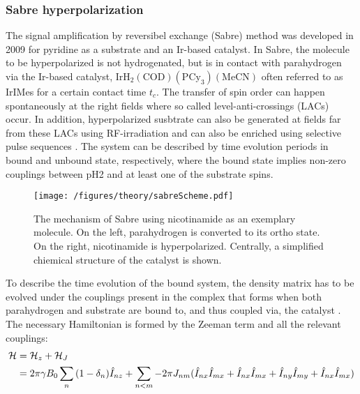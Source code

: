         \subsubsection{Sabre hyperpolarization}
        \label{section:theory:HPSabre}
        The signal amplification by reversibel exchange (Sabre) method was developed in 2009 \cite{adams_reversible_2009-2} for pyridine as a substrate and an Ir-based catalyst.
        In Sabre, the molecule to be hyperpolarized is not hydrogenated, but is in contact with parahydrogen via the Ir-based catalyst, $\mathrm{IrH_2(COD)(PCy_3)(MeCN)}$ often referred to as IrIMes for a certain contact time $t_c$. The transfer of spin order can happen spontaneously at the right fields \cite{atkinson_spontaneous_2009-1} where so called level-anti-crossings (LACs) occur. In addition, hyperpolarized susbtrate can also be generated at fields far from these LACs using RF-irradiation \cite{pravdivtsev_spin_2014, knecht_quantitative_2019} and can also be enriched using selective pulse sequences \cite{knecht_re-polarization_2018-1}. The system can be described by time evolution periods in bound and unbound state, respectively, where the bound state implies non-zero couplings between pH2 and at least one of the substrate spins.
            \begin{figure}
                \centering
                \texttt{[image: /figures/theory/sabreScheme.pdf]}
                \caption[Sabre scheme]{The mechanism of Sabre using nicotinamide as an exemplary molecule. On the left, parahydrogen is converted to its ortho state. On the right, nicotinamide is hyperpolarized. Centrally, a simplified chiemical structure of the catalyst is shown.}
            \end{figure}
            To describe the time evolution of the bound system, the density matrix has to be evolved under the couplings present in the complex that forms when both parahydrogen and substrate are bound to, and thus coupled via, the catalyst \cite{}. The necessary Hamiltonian is formed by the Zeeman term and all the relevant couplings:
            \begin{equation}
                \begin{aligned}
                    \mathcal{H}& = \mathcal{H}_z + \mathcal{H}_J \\
                        & =\-2\pi\gamma B_0 \sum_n{(1-\delta_n)\hat{I}_{nz}} + \sum_{n<m} -2\pi J_{nm}(\hat{I}_{nx}\hat{I}_{mx} + \hat{I}_{nx}\hat{I}_{mx}+ \hat{I}_{ny}\hat{I}_{my} + \hat{I}_{nx}\hat{I}_{mx})
                \end{aligned}
            \end{equation}
